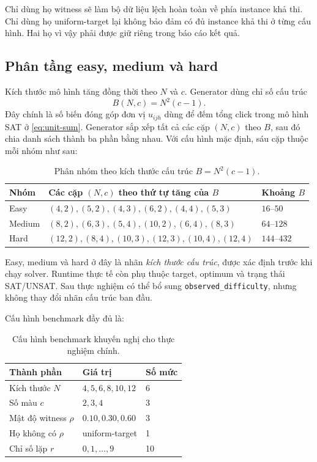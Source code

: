 \documentclass[11pt,a4paper]{article}
\begin{document}
Chỉ dùng họ witness sẽ làm bộ dữ liệu lệch hoàn toàn về phía instance khả
thi. Chỉ dùng họ uniform-target lại không bảo đảm có đủ instance khả thi ở
từng cấu hình. Hai họ vì vậy phải được giữ riêng trong báo cáo kết quả.

\subsection{Phân tầng easy, medium và hard}

Kích thước mô hình tăng đồng thời theo $N$ và $c$. Generator dùng chỉ số
cấu trúc
\begin{equation}\label{eq:structural-score}
  B(N,c)=N^2(c-1).
\end{equation}
Đây chính là số biến đóng góp đơn vị $u_{ijh}$ dùng để đếm tổng click trong
mô hình SAT ở \cref{eq:unit-sum}. Generator sắp xếp tất cả các cặp $(N,c)$
theo $B$, sau đó chia danh sách thành ba phần bằng nhau. Với cấu hình mặc
định, sáu cặp thuộc mỗi nhóm như sau:

\begin{table}[H]
\centering
\caption{Phân nhóm theo kích thước cấu trúc $B=N^2(c-1)$.}
\label{tab:size-tiers}
\begin{tabularx}{\textwidth}{@{}l X l@{}}
\toprule
\textbf{Nhóm} & \textbf{Các cặp $(N,c)$ theo thứ tự tăng của $B$}
& \textbf{Khoảng $B$} \\
\midrule
Easy
& $(4,2),(5,2),(4,3),(6,2),(4,4),(5,3)$
& $16$--$50$ \\
Medium
& $(8,2),(6,3),(5,4),(10,2),(6,4),(8,3)$
& $64$--$128$ \\
Hard
& $(12,2),(8,4),(10,3),(12,3),(10,4),(12,4)$
& $144$--$432$ \\
\bottomrule
\end{tabularx}
\end{table}

\begin{notebox}
Easy, medium và hard ở đây là nhãn \emph{kích thước cấu trúc}, được xác định
trước khi chạy solver. Runtime thực tế còn phụ thuộc target, optimum và trạng
thái SAT/UNSAT. Sau thực nghiệm có thể bổ sung
\texttt{observed\_difficulty}, nhưng không thay đổi nhãn cấu trúc ban đầu.
\end{notebox}

Cấu hình benchmark đầy đủ là:

\begin{table}[H]
\centering
\caption{Cấu hình benchmark khuyến nghị cho thực nghiệm chính.}
\label{tab:data-config}
\begin{tabularx}{\textwidth}{@{}l X l@{}}
\toprule
\textbf{Thành phần} & \textbf{Giá trị} & \textbf{Số mức} \\
\midrule
Kích thước $N$ & $4,5,6,8,10,12$ & 6 \\
Số màu $c$ & $2,3,4$ & 3 \\
Mật độ witness $\rho$ & $0.10,0.30,0.60$ & 3 \\
Họ không có $\rho$ & uniform-target & 1 \\
Chỉ số lặp $r$ & $0,1,\ldots,9$ & 10 \\
\bottomrule
\end{tabularx}
\end{table}
\end{document}
